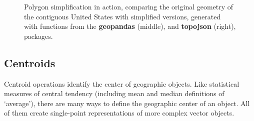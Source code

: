 \documentclass[
  letterpaper,
]{krantz}
\begin{document}
\begin{figure}

\begin{minipage}{0.33\linewidth}



\end{minipage}%
%
\begin{minipage}{0.33\linewidth}



\end{minipage}%
%
\begin{minipage}{0.33\linewidth}



\end{minipage}%

\caption{\label{fig-simplify-polygons}Polygon simplification in action,
comparing the original geometry of the contiguous United States with
simplified versions, generated with functions from the
\textbf{geopandas} (middle), and \textbf{topojson} (right), packages.}

\end{figure}%

\subsection{Centroids}\label{sec-centroids}

Centroid operations identify the center of geographic objects. Like
statistical measures of central tendency (including mean and median
definitions of `average'), there are many ways to define the geographic
center of an object. All of them create single-point representations of
more complex vector objects.
\end{document}
